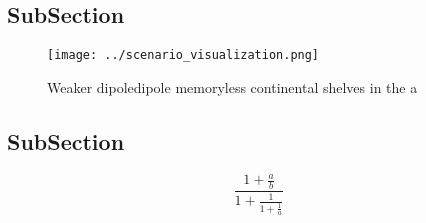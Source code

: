 \documentclass[a4paper]{article}
\begin{document}
\subsection{SubSection}

\begin{figure}
\centering
\texttt{[image: ../scenario\_visualization.png]}
\caption{Weaker dipoledipole memoryless continental shelves in the a
}
\end{figure}
 
\subsection{SubSection}

\[ \frac{1+\frac{a}{b}}{1+\frac{1}{1+\frac{1}{a}}} \]
\end{document}
